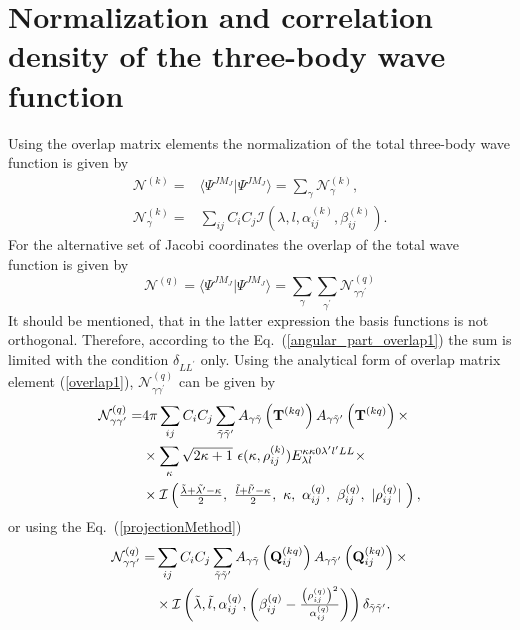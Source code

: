 \documentclass[
12pt, %
oneside, %
english, %
onehalfspacing, %
onehalfspacing, %
headsepline, %
]{MastersDoctoralThesis} %
\begin{document}
\section{Normalization and correlation density of the three-body wave function}
Using the overlap matrix elements the normalization of the total three-body wave function is given by
\begin{align}
\mathcal{N}^{(k)}= & \langle \Psi^{JM_J} \vert \Psi^{JM_J} \rangle = \sum_{\gamma} \mathcal{N}^{(k)}_{\gamma},    \nonumber \\
 \mathcal{N}^{(k)}_{\gamma} = & \sum_{ij} C_i C_j \mathcal{I} \left( \lambda,l,\alpha_{ij}^{(k)},\beta_{ij}^{(k)} \right).
\end{align}
For the alternative set of Jacobi coordinates the overlap of the total wave function is given by
\begin{equation}
\mathcal{N}^{(q)}= \langle \Psi^{JM_J} \vert \Psi^{JM_J} \rangle = \sum_{\gamma} \sum_{\gamma^{\prime}} \mathcal{N}^{(q)}_{\gamma \gamma^{\prime}}
\end{equation}
It should be mentioned, that in the latter expression the basis functions is not orthogonal. Therefore, according to the Eq.~(\ref{angular_part_overlap1}) the sum is limited with the condition $\delta_{LL^{\prime}}$ only. Using the analytical form  of overlap matrix element (\ref{overlap1}), $\mathcal{N}^{(q)}_{\gamma \gamma^{\prime}}$ can be given by
\begin{align}
\mathcal{N}^{(q)}_{\gamma \gamma^{\prime}}= & 4 \pi \sum_{ij} C_i C_j \sum_{\tilde{\gamma}\tilde{\gamma}^{\prime}}  A_{\gamma\tilde{\gamma}}\left( {\bf T}^{(kq)} \right) A_{\gamma\tilde{\gamma}^{\prime}}\left( {\bf T}^{(kq)} \right) \times
\nonumber \\
 & \times \sum_{\kappa} \sqrt{2\kappa+1}~ \epsilon(\kappa, \rho^{(k)}_{ij}) {E}^{\kappa \kappa 0 \lambda^{\prime} l^{\prime} L L}_{\lambda l} \times  \nonumber 
 \\ & \times \mathcal{I}\left(
 \tfrac{\tilde{\lambda}+\tilde{\lambda^{\prime}}-\kappa}{2}, ~
 \tfrac{\tilde{l}+\tilde{l^{\prime}}-\kappa}{2},~
 \kappa,~
 \alpha^{(q)}_{ij},~
 \beta^{(q)}_{ij} ,~
 \vert \rho^{(q)}_{ij} \vert ~
  \right),
\end{align}
or using the Eq.~(\ref{projectionMethod})
\begin{align}
\mathcal{N}^{(q)}_{\gamma \gamma^{\prime}}= & \sum_{ij} C_i C_j  \sum_{\tilde{\gamma}\tilde{\gamma}^{\prime}}
A_{\gamma\tilde{\gamma}}\left( {\bf Q}_{ij}^{(kq)} \right)
 A_{\gamma\tilde{\gamma}^{\prime}}\left( {\bf Q}_{ij}^{(kq)} \right) \times\nonumber \\
 & \times
  \mathcal{I} \left( \tilde{\lambda}, \tilde{l}, \alpha^{(q)}_{ij}, \left(  \beta^{(q)}_{ij} - \tfrac{\left(\rho^{(q)}_{ij}\right)^2}{\alpha^{(q)}_{ij}} \right) \right) \delta_{\tilde{\gamma}\tilde{\gamma}^{\prime}}.
\end{align}  
\end{document}
